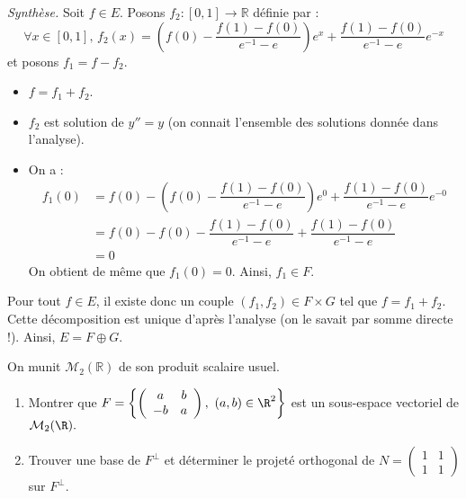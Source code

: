 \documentclass[a4paper,10pt]{report}
\begin{document}
 \noindent \textit{Synthèse.} Soit $f \in E$. Posons $f_2 : [0,1] \rightarrow \mathbb{R}$ définie par :
 $$ \forall x \in [0,1], \, f_2(x)= \left(f(0) - \dfrac{f(1)-f(0)}{e^{-1}-e} \right) e^x + \dfrac{f(1)-f(0)}{e^{-1}-e} e^{-x}$$
 et posons $f_1 = f-f_2$. 
 \begin{itemize}
 \item $f=f_1+f_2$.
 \item $f_2$ est solution de $y''=y$ (on connait l'ensemble des solutions donnée dans l'analyse).
 \item On a :
 \begin{align*}
 f_1(0) & = f(0) - \left(f(0) - \dfrac{f(1)-f(0)}{e^{-1}-e} \right) e^0 + \dfrac{f(1)-f(0)}{e^{-1}-e} e^{-0} \\
 & = f(0) -f(0) - \dfrac{f(1)-f(0)}{e^{-1}-e} + \dfrac{f(1)-f(0)}{e^{-1}-e} \\
 & = 0 
 \end{align*}
 On obtient de même que $f_1(0)=0$. Ainsi, $f_1 \in F$.
 \end{itemize}
 Pour tout $f \in E$, il existe donc un couple $(f_1,f_2) \in F \times G$ tel que $f=f_1+f_2$. Cette décomposition est unique d'après l'analyse (on le savait par somme directe !). Ainsi, $E= F \oplus G$.
 
 
 
 \begin{Exercice}{} On munit $\mathcal{M}_2(\mathbb{R})$ de son produit scalaire usuel.
\begin{enumerate}
\item Montrer que $F=\left\{\left(\begin{array}{cc} a & b\\ -b & a \end{array}\right),\ (a,b)\in\R^2\right
\}$ est un sous-espace vectoriel de ${\cal M}_2(\R).$
\item Trouver une base de $F^{\perp}$ et d\'eterminer le projet\'e orthogonal de $N=\left(\begin{array}{cc} 1&1\\ 1&1 \end{array}\right)$ sur $F^{\perp}$.
\end{enumerate}
\end{Exercice}

\corr 
\end{document}

